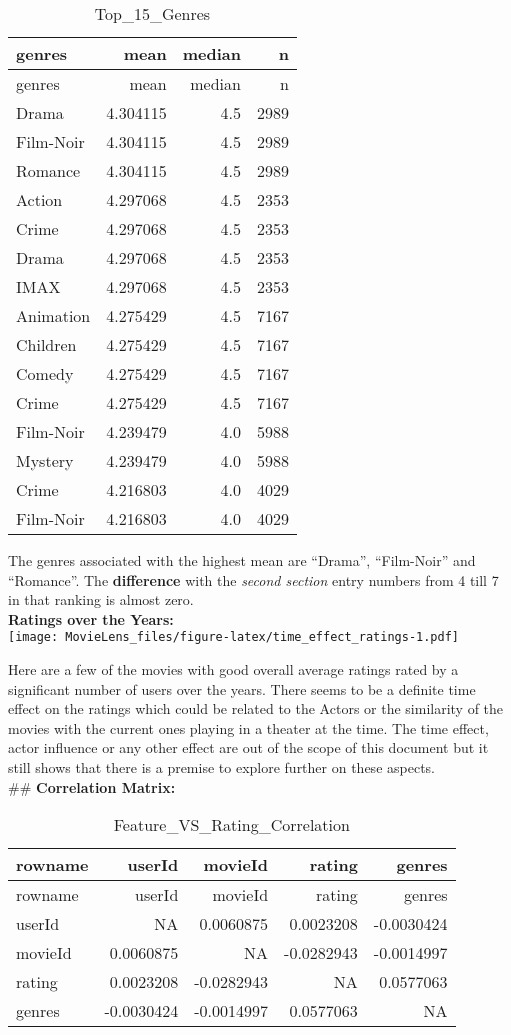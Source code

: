 \documentclass[
]{article}
\begin{document}
\begin{longtable}[]{@{}lrrr@{}}
\caption{Top\_15\_Genres}\tabularnewline
\toprule
genres & mean & median & n\tabularnewline
\midrule
\endfirsthead
\toprule
genres & mean & median & n\tabularnewline
\midrule
\endhead
Drama & 4.304115 & 4.5 & 2989\tabularnewline
Film-Noir & 4.304115 & 4.5 & 2989\tabularnewline
Romance & 4.304115 & 4.5 & 2989\tabularnewline
Action & 4.297068 & 4.5 & 2353\tabularnewline
Crime & 4.297068 & 4.5 & 2353\tabularnewline
Drama & 4.297068 & 4.5 & 2353\tabularnewline
IMAX & 4.297068 & 4.5 & 2353\tabularnewline
Animation & 4.275429 & 4.5 & 7167\tabularnewline
Children & 4.275429 & 4.5 & 7167\tabularnewline
Comedy & 4.275429 & 4.5 & 7167\tabularnewline
Crime & 4.275429 & 4.5 & 7167\tabularnewline
Film-Noir & 4.239479 & 4.0 & 5988\tabularnewline
Mystery & 4.239479 & 4.0 & 5988\tabularnewline
Crime & 4.216803 & 4.0 & 4029\tabularnewline
Film-Noir & 4.216803 & 4.0 & 4029\tabularnewline
\bottomrule
\end{longtable}

The genres associated with the highest mean are ``Drama'', ``Film-Noir''
and ``Romance''. The \textbf{difference} with the \emph{second section}
entry numbers from 4 till 7 in that ranking is almost zero.\\
\newpage \textbf{Ratings over the Years:}\\
\texttt{[image: MovieLens\_files/figure-latex/time\_effect\_ratings-1.pdf]}

Here are a few of the movies with good overall average ratings rated by
a significant number of users over the years. There seems to be a
definite time effect on the ratings which could be related to the Actors
or the similarity of the movies with the current ones playing in a
theater at the time. The time effect, actor influence or any other
effect are out of the scope of this document but it still shows that
there is a premise to explore further on these aspects.\\
\newpage \#\# \textbf{Correlation Matrix:}

\begin{longtable}[]{@{}lrrrr@{}}
\caption{Feature\_VS\_Rating\_Correlation}\tabularnewline
\toprule
rowname & userId & movieId & rating & genres\tabularnewline
\midrule
\endfirsthead
\toprule
rowname & userId & movieId & rating & genres\tabularnewline
\midrule
\endhead
userId & NA & 0.0060875 & 0.0023208 & -0.0030424\tabularnewline
movieId & 0.0060875 & NA & -0.0282943 & -0.0014997\tabularnewline
rating & 0.0023208 & -0.0282943 & NA & 0.0577063\tabularnewline
genres & -0.0030424 & -0.0014997 & 0.0577063 & NA\tabularnewline
\bottomrule
\end{longtable}
\end{document}
